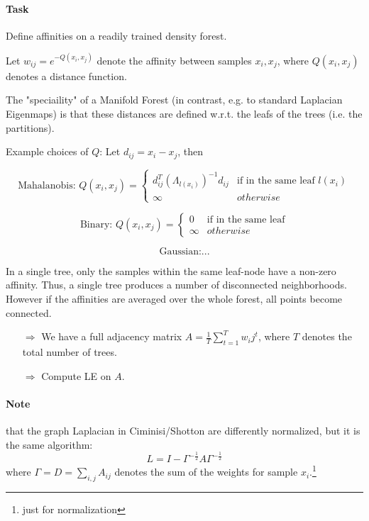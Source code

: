 \paragraph{Task} Define affinities on a readily trained density forest.

Let \(w_{ij} = e^{-Q(x_i, x_j)}\) denote the affinity between samples \(x_i,x_j\), where \(Q(x_i, x_j)\) denotes a distance function.

The "speciaility" of a Manifold Forest (in contrast, e.g. to standard Laplacian Eigenmaps) is that these distances are defined w.r.t. the leafs of the trees (i.e. the partitions).

\bigbreak

Example choices of \(Q\): Let \(d_{ij} = x_i - x_j\), then

\[\text{Mahalanobis: } Q(x_i, x_j) = \begin{cases} d_{ij}^T(\Lambda_{l(x_i)})^{-1} d_{ij} & \text{if in the same leaf } l(x_i) \\ \infty & otherwise \end{cases}\]

\[\text{Binary: } Q(x_i, x_j) = \begin{cases} 0 & \text{if in the same leaf} \\ \infty & otherwise \end{cases}\]

\[\text{Gaussian:} ...\]

In a single tree, only the samples within the same leaf-node have a non-zero affinity. Thus, a single tree produces a number of disconnected neighborhoods.
However if the affinities are averaged over the whole forest, all points become connected.

\begin{itemize}
  \item[\(\Rightarrow\)] We have a full adjacency matrix \(A = \frac{1}{T} \sum_{t=1}^T w_ij^t\), where \(T\) denotes the total number of trees.
  \item[\(\Rightarrow\)] Compute LE on \(A\).
\end{itemize}

\paragraph{Note} that the graph Laplacian in Ciminisi/Shotton  are differently normalized, but it is the same algorithm:
\[L = I - \Gamma^{-\frac{1}{2}} A \Gamma^{-\frac{1}{2}}\]
where \(\Gamma = D = \sum_{i,j} A_{ij}\) denotes the sum of the weights for sample \(x_i\).\footnote{just for normalization}

